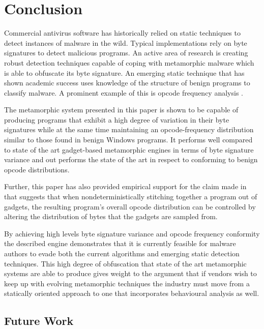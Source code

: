 \chapter{Conclusion}

    Commercial antivirus software has historically relied on static techniques
    to detect instances of malware in the wild. Typical implementations rely on
    byte signatures to detect malicious programs. An active area of research is
    creating robust detection techniques capable of coping with metamorphic
    malware which is able to obfuscate its byte signature. An emerging static
    technique that has shown academic success uses knowledge of the structure of
    benign programs to classify malware. A prominent example of this is opcode
    frequency analysis \cite{chisquared}.

    The metamorphic system presented in this paper is shown to be capable of
    producing programs that exhibit a high degree of variation in their
    byte signatures while at the same time maintaining an opcode-frequency
    distribution similar to those found in benign Windows programs. It performs
    well compared to state of the art gadget-based metamorphic engines in terms
    of byte signature variance and out performs the state of the art in respect
    to conforming to benign opcode distributions.

    Further, this paper has also provided empirical support for the claim made
    in \cite{franken} that suggests that when nondeterministically stitching
    together a program out of gadgets, the resulting program's overall opcode
    distribution can be controlled by altering the distribution of bytes that
    the gadgets are sampled from.

    By achieving high levels byte signature variance and opcode frequency
    conformity the described engine demonstrates that it is currently feasible
    for malware authors to evade both the current algorithms and emerging static
    detection techniques. This high degree of obfuscation that state of the art
    metamorphic systems are able to produce gives weight to the argument that if
    vendors wish to keep up with evolving metamorphic techniques the industry
    must move from a statically oriented approach to one that incorporates
    behavioural analysis as well.

    \section{Future Work}

